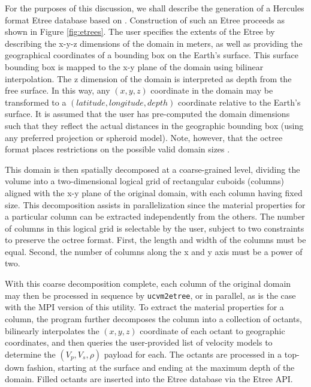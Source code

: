 For the purposes of this discussion, we shall describe the generation of a Hercules format Etree database based on \citet{Taborda_2007_Proc}. Construction of such an Etree proceeds as shown in Figure \ref{fig:etrees}. The user specifies the extents of the Etree by describing the x-y-z dimensions of the domain in meters, as well as providing the geographical coordinates of a bounding box on the Earth's surface. This surface bounding box is mapped to the x-y plane of the domain using bilinear interpolation. The z dimension of the domain is interpreted as depth from the free surface. In this way, any $(x,y,z)$ coordinate in the domain may be transformed to a $(latitude, longitude, depth)$ coordinate relative to the Earth's surface. It is assumed that the user has pre-computed the domain dimensions such that they reflect the actual distances in the geographic bounding box (using any preferred projection or spheroid model). Note, however, that the octree format places restrictions on the possible valid domain sizes \citep{Tu_2003_Tech, Taborda_2007_Proc}.

This domain is then spatially decomposed at a coarse-grained level, dividing the volume into a two-dimensional logical grid of rectangular cuboids (columns) aligned with the x-y plane of the original domain, with each column having fixed size. This decomposition assists in parallelization since the material properties for a particular column can be extracted independently from the others. The number of columns in this logical grid is selectable by the user, subject to two constraints to preserve the octree format. First, the length and width of the columns must be equal. Second, the number of columns along the x and y axis must be a power of two.

With this coarse decomposition complete, each column of the original domain may then be processed in sequence by \texttt{ucvm2etree}, or in parallel, as is the case with the MPI version of this utility. To extract the material properties for a column, the program further decomposes the column into a collection of octants, bilinearly interpolates the $(x,y,z)$ coordinate of each octant to geographic coordinates, and then queries the user-provided list of velocity models to determine the $(V_p, V_s, \rho)$ payload for each. The octants are processed in a top-down fashion, starting at the surface and ending at the maximum depth of the domain. Filled octants are inserted into the Etree database via the Etree API.

